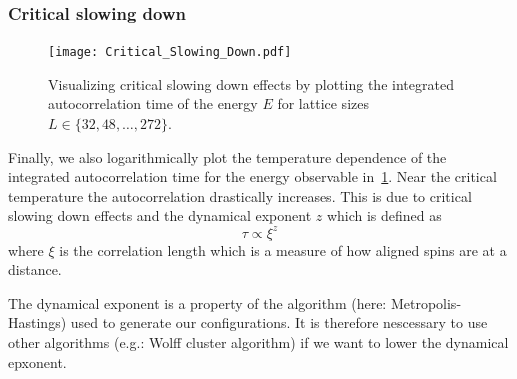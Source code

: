 \subsubsection{Critical slowing down}
\begin{figure}
	\centering
	\texttt{[image: Critical\_Slowing\_Down.pdf]}
	\caption[Critical slowing down effect for different lattice sizes.]{Visualizing critical slowing down effects by plotting the integrated autocorrelation time of the energy $E$ for lattice sizes $L\in\{32, 48, \dots, 272\}$.}
	\label{fig:critical_slowing_down}
\end{figure}
Finally, we also logarithmically plot the temperature dependence of the integrated autocorrelation time for the energy observable in~\cref{fig:critical_slowing_down}. Near the critical temperature the autocorrelation drastically increases. This is due to critical slowing down effects and the dynamical exponent $z$ which is defined as
\begin{equation}
	\tau \propto \xi^z
\end{equation}
where $\xi$ is the correlation length which is a measure of how aligned spins are at a distance.

The dynamical exponent is a property of the algorithm (here: Metropolis-Hastings) used to generate our configurations. It is therefore nescessary to use other algorithms (e.g.: Wolff cluster algorithm) if we want to lower the dynamical epxonent.